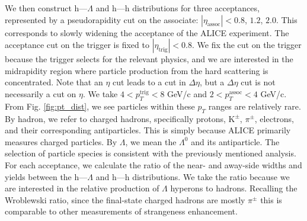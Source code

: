 \documentclass[../main.tex]{subfiles}
\begin{document}
We then construct h---$\Lambda$ and h---h distributions for three acceptances, represented by a pseudorapidity cut on the associate: $|\eta_{\text{assoc}}| < 0.8$, $1.2$, $2.0$. This corresponds to slowly widening the acceptance of the ALICE experiment. The acceptance cut on the trigger is fixed to $|\eta_{\text{trig}}|<0.8$. We fix the cut on the trigger because the trigger selects for the relevant physics, and we are interested in the midrapidity region where particle production from the hard scattering is concentrated. Note that an $\eta$ cut leads to a cut in $\Delta \eta$, but a $\Delta\eta$ cut is not necessarily a cut on $\eta$. We take $4<p_T^{\text{trig}}<8$ GeV/c and $2<p_T^{\text{assoc}}<4$ GeV/c. From Fig. \ref{fig:pt_dist}, we see particles within these $p_T$ ranges are relatively rare. By hadron, we refer to charged hadrons, specifically protons, $\text{K}^{\pm}$, $\pi^{\pm}$, electrons, and their corresponding antiparticles. This is simply because ALICE primarily measures charged particles. By $\Lambda$, we mean the $\Lambda^0$ and its antiparticle. The selection of particle species is consistent with the previously mentioned analysis. For each acceptance, we calculate the ratio of the near- and away-side widths and yields between the h---$\Lambda$ and h---h distributions. We take the ratio because we are interested in the relative production of $\Lambda$ hyperons to hadrons. Recalling the Wroblewski ratio, since the final-state charged hadrons are mostly $\pi^{\pm}$ this is comparable to other measurements of strangeness enhancement. 
\end{document}
